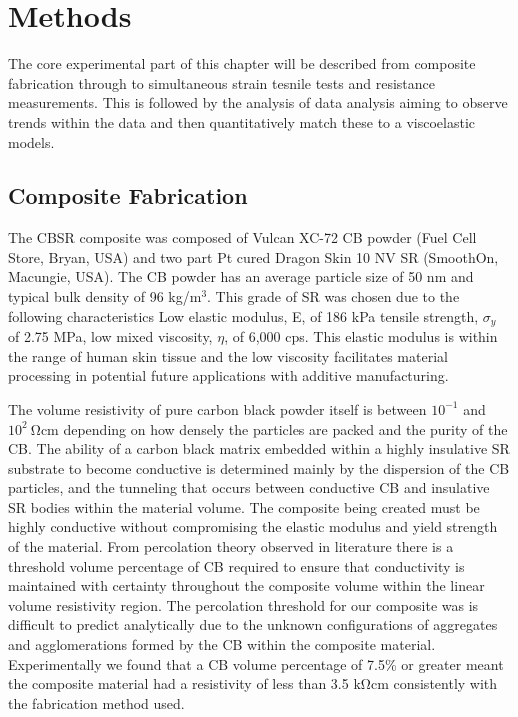 \section{Methods}
The core experimental part of this chapter will be described from composite fabrication through to simultaneous strain tesnile tests and resistance measurements. This is followed by the analysis of data analysis aiming to observe trends within the data and then quantitatively match these to a viscoelastic models.


\subsection{Composite Fabrication}
The CBSR composite was composed of Vulcan XC-72 CB powder (Fuel Cell Store, Bryan, USA) and two part Pt cured Dragon Skin 10 NV SR (SmoothOn, Macungie, USA). The CB powder has an average particle size of 50 nm and typical bulk density of 96 kg/m$^3$. This grade of SR was chosen due to the following characteristics  Low elastic modulus, E, of 186 kPa tensile strength, $\sigma_y$ of 2.75 MPa, low mixed viscosity, $\eta$, of 6,000 cps\cite{SmoothOn2021}. This elastic modulus is within the range of human skin tissue and the low viscosity facilitates material processing in potential future applications with additive manufacturing.

The volume resistivity of pure carbon black powder itself is between $10^{-1}$ and $10^2 \ \mathrm{\Omega cm}$ depending on how densely the particles are packed and the purity of the CB\cite{Spahr2017}. The ability of a carbon black matrix embedded within a highly insulative SR substrate to become conductive is determined mainly by the dispersion of the CB particles, and the tunneling that occurs between conductive CB and insulative SR bodies within the material volume\cite{Spahr2017,Wang2013}. The composite being created must be highly conductive without compromising the elastic modulus and yield strength of the material. From percolation theory observed in literature \cite{Spahr2017} there is a threshold volume percentage of CB required to ensure that conductivity is maintained with certainty throughout the composite volume within the linear volume resistivity region. The percolation threshold for our composite was is difficult to predict analytically due to the unknown configurations of aggregates and agglomerations formed by the CB within the composite material. Experimentally we found that a CB volume percentage of 7.5\% or greater meant the composite material had a resistivity of less than 3.5 $\mathrm{k\Omega cm}$ consistently with the fabrication method used.

